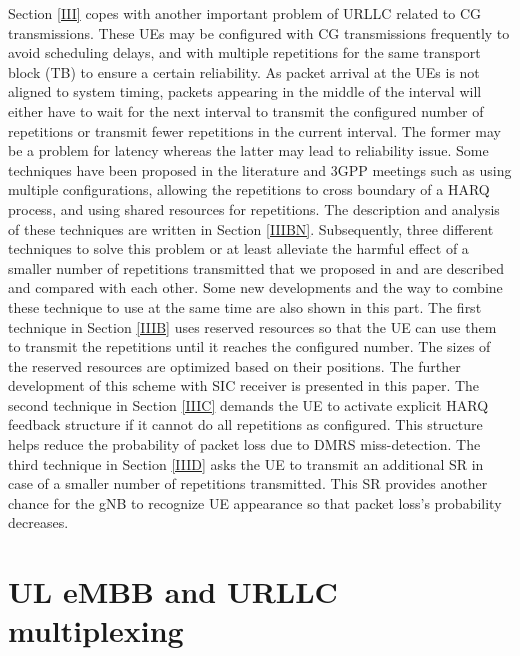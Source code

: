\documentclass{ieeeaccess}
\begin{document}
Section \ref{III} copes with another important problem of URLLC related to CG transmissions. These UEs may be configured with CG transmissions frequently to avoid scheduling delays, and with multiple repetitions for the same transport block (TB) to ensure a certain reliability. As packet arrival at the UEs is not aligned to system timing, packets appearing in the middle of the interval will either have to wait for the next interval to transmit the configured number of repetitions or transmit fewer repetitions in the current interval. The former may be a problem for latency whereas the latter may lead to reliability issue. Some techniques have been proposed in the literature and 3GPP meetings such as using multiple configurations, allowing the repetitions to cross boundary of a HARQ process, and using shared resources for repetitions. The description and analysis of these techniques are written in Section \ref{IIIBN}. Subsequently, three different techniques to solve this problem or at least alleviate the harmful effect of a smaller number of repetitions transmitted that we proposed in \cite{b9} and \cite{ad100} are described and compared with each other. Some new developments and the way to combine these technique to use at the same time are also shown in this part. The first technique in Section \ref{IIIB} uses reserved resources so that the UE can use them to transmit the repetitions until it reaches the configured number. The sizes of the reserved resources are optimized based on their positions. The further development of this scheme with SIC receiver is presented in this paper. The second technique in Section \ref{IIIC} demands the UE to activate explicit HARQ feedback structure if it cannot do all repetitions as configured. This structure helps reduce the probability of packet loss due to DMRS miss-detection. The third technique in Section \ref{IIID} asks the UE to transmit an additional SR in case of a smaller number of repetitions transmitted. This SR provides another chance for the gNB to recognize UE appearance so that packet loss's probability decreases. 

\section{UL eMBB and URLLC multiplexing}\label{II}
\end{document}
